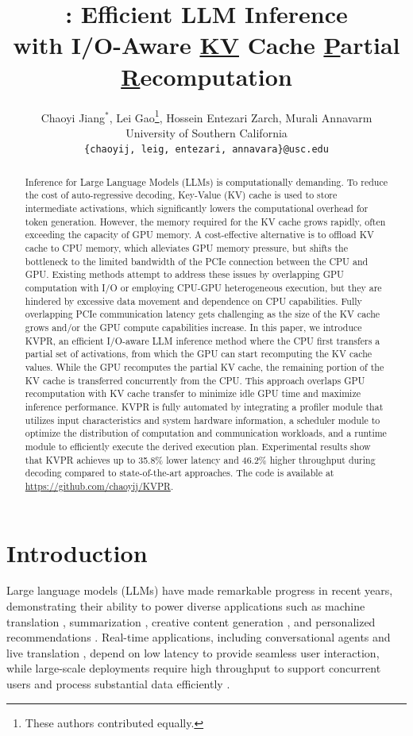 \documentclass[11pt]{article}
\title{\paperName: Efficient LLM Inference \\ with I/O-Aware \underline{KV} Cache \underline{P}artial \underline{R}ecomputation}
\author{%
  Chaoyi Jiang$^{*}$, Lei Gao\thanks{These authors contributed equally.}, Hossein Entezari Zarch, Murali Annavarm\\
  University of Southern California\\
  \texttt{\{chaoyij, leig, entezari, annavara\}@usc.edu}\\
}
\begin{document}
\maketitle

\begin{abstract}
Inference for Large Language Models (LLMs) is computationally demanding. To reduce the cost of auto-regressive decoding, Key-Value (KV) cache is used to store intermediate activations, which significantly lowers the computational overhead for token generation. However, the memory required for the KV cache grows rapidly, often exceeding the capacity of GPU memory. A cost-effective alternative is to offload KV cache to CPU memory, which alleviates GPU memory pressure, but shifts the bottleneck to the limited bandwidth of the PCIe connection between the CPU and GPU. Existing methods attempt to address these issues by overlapping GPU computation with I/O or employing CPU-GPU heterogeneous execution, but they are hindered by excessive data movement and dependence on CPU capabilities. Fully overlapping PCIe communication latency gets challenging as the size of the KV cache grows and/or the GPU compute capabilities increase. In this paper, we introduce KVPR, an efficient I/O-aware LLM inference method where the CPU first transfers a partial set of activations, from which the GPU can start recomputing the KV cache values. While the GPU recomputes the partial KV cache, the remaining portion of the KV cache is transferred concurrently from the CPU. This approach overlaps GPU recomputation with KV cache transfer to minimize idle GPU time and maximize inference performance. KVPR is fully automated by integrating a profiler module that utilizes input characteristics and system hardware information, a scheduler module to optimize the distribution of computation and communication workloads, and a runtime module to efficiently execute the derived execution plan. Experimental results show that KVPR achieves up to 35.8\% lower latency and 46.2\% higher throughput during decoding compared to state-of-the-art approaches. The code is available at \url{https://github.com/chaoyij/KVPR}.
\end{abstract}


\section{Introduction}
Large language models (LLMs) have made remarkable progress in recent years, demonstrating their ability to power diverse applications such as machine translation \cite{zhu2024multilingual}, summarization \cite{openai2024gpt4}, creative content generation \cite{geminiteam2024gemini}, and personalized recommendations \cite{geng2022p5}. Real-time applications, including conversational agents and live translation \cite{li2023camel}, depend on low latency to provide seamless user interaction, while large-scale deployments require high throughput to support concurrent users and process substantial data efficiently \cite{kwon2023vllm}.
\end{document}
